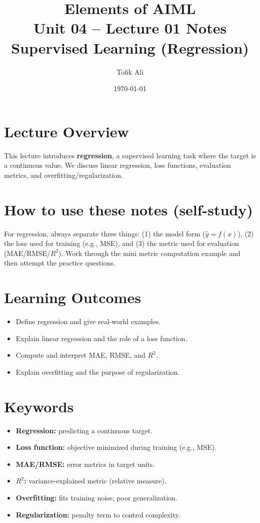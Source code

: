 \documentclass[11pt]{article}
\title{Elements of AIML\\Unit 04 -- Lecture 01 Notes\\Supervised Learning (Regression)}
\author{Tofik Ali}
\date{\today}
\begin{document}
\maketitle
\tableofcontents

\section{Lecture Overview}
This lecture introduces \textbf{regression}, a supervised learning task where the target is a continuous value.
We discuss linear regression, loss functions, evaluation metrics, and overfitting/regularization.
\notesources{\AIMLUnitIVSources}

\section{How to use these notes (self-study)}
For regression, always separate three things: (1) the model form ($\hat{y}=f(x)$), (2) the loss used for training (e.g., MSE), and (3) the metric used for evaluation (MAE/RMSE/$R^2$).
Work through the mini metric computation example and then attempt the practice questions.

\section{Learning Outcomes}
\begin{itemize}[leftmargin=*]
  \item Define regression and give real-world examples.
  \item Explain linear regression and the role of a loss function.
  \item Compute and interpret MAE, RMSE, and $R^2$.
  \item Explain overfitting and the purpose of regularization.
\end{itemize}

\section{Keywords}
\begin{itemize}[leftmargin=*]
  \item \textbf{Regression:} predicting a continuous target.
  \item \textbf{Loss function:} objective minimized during training (e.g., MSE).
  \item \textbf{MAE/RMSE:} error metrics in target units.
  \item \textbf{$R^2$:} variance-explained metric (relative measure).
  \item \textbf{Overfitting:} fits training noise; poor generalization.
  \item \textbf{Regularization:} penalty term to control complexity.
\end{itemize}
\end{document}
